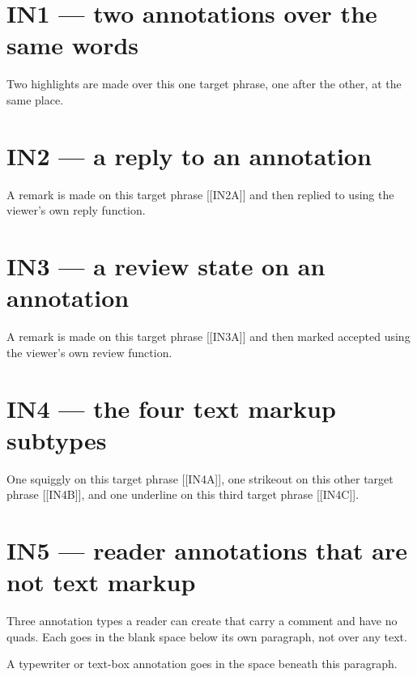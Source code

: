 \documentclass[11pt,a4paper]{article}
\begin{document}
\section*{IN1 --- two annotations over the same words}

Two highlights are made over this one target phrase, one after the
other, at the same place.

\section*{IN2 --- a reply to an annotation}

A remark is made on this target phrase [[IN2A]] and then replied to
using the viewer's own reply function.

\section*{IN3 --- a review state on an annotation}

A remark is made on this target phrase [[IN3A]] and then marked
accepted using the viewer's own review function.

\section*{IN4 --- the four text markup subtypes}

One squiggly on this target phrase [[IN4A]], one strikeout on this
other target phrase [[IN4B]], and one underline on this third target
phrase [[IN4C]].

\clearpage
\section*{IN5 --- reader annotations that are not text markup}

Three annotation types a reader can create that carry a comment and
have no quads. Each goes in the blank space below its own paragraph, not
over any text.

A typewriter or text-box annotation goes in the space beneath this
paragraph.

\vspace{60pt}
\end{document}

